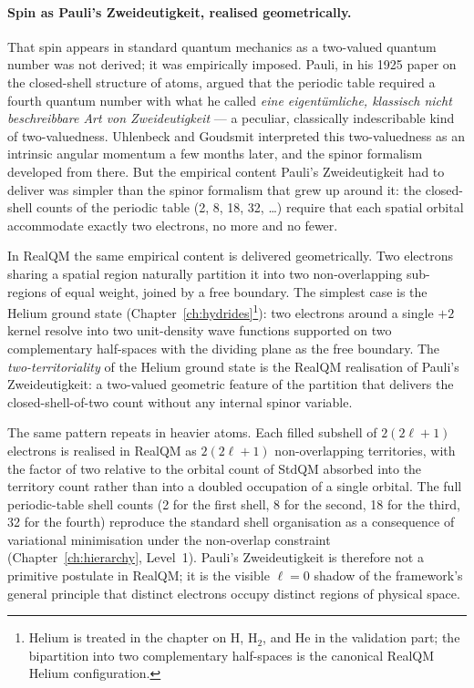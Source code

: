 \paragraph{Spin as Pauli's Zweideutigkeit, realised geometrically.}
That spin appears in standard quantum mechanics as a two-valued quantum number was not derived; it was empirically imposed. Pauli, in his 1925 paper on the closed-shell structure of atoms, argued that the periodic table required a fourth quantum number with what he called \emph{eine eigent\"umliche, klassisch nicht beschreibbare Art von Zweideutigkeit} --- a peculiar, classically indescribable kind of two-valuedness. Uhlenbeck and Goudsmit interpreted this two-valuedness as an intrinsic angular momentum a few months later, and the spinor formalism developed from there. But the empirical content Pauli's Zweideutigkeit had to deliver was simpler than the spinor formalism that grew up around it: the closed-shell counts of the periodic table (2, 8, 18, 32, \ldots) require that each spatial orbital accommodate exactly two electrons, no more and no fewer.

In RealQM the same empirical content is delivered geometrically. Two electrons sharing a spatial region naturally partition it into two non-overlapping sub-regions of equal weight, joined by a free boundary. The simplest case is the Helium ground state (Chapter~\ref{ch:hydrides}\footnote{Helium is treated in the chapter on H, H$_2$, and He in the validation part; the bipartition into two complementary half-spaces is the canonical RealQM Helium configuration.}): two electrons around a single $+2$ kernel resolve into two unit-density wave functions supported on two complementary half-spaces with the dividing plane as the free boundary. The \emph{two-territoriality} of the Helium ground state is the RealQM realisation of Pauli's Zweideutigkeit: a two-valued geometric feature of the partition that delivers the closed-shell-of-two count without any internal spinor variable.

The same pattern repeats in heavier atoms. Each filled subshell of $2(2\ell+1)$ electrons is realised in RealQM as $2(2\ell+1)$ non-overlapping territories, with the factor of two relative to the orbital count of StdQM absorbed into the territory count rather than into a doubled occupation of a single orbital. The full periodic-table shell counts (2 for the first shell, 8 for the second, 18 for the third, 32 for the fourth) reproduce the standard shell organisation as a consequence of variational minimisation under the non-overlap constraint (Chapter~\ref{ch:hierarchy}, Level~1). Pauli's Zweideutigkeit is therefore not a primitive postulate in RealQM; it is the visible $\ell{=}0$ shadow of the framework's general principle that distinct electrons occupy distinct regions of physical space.

